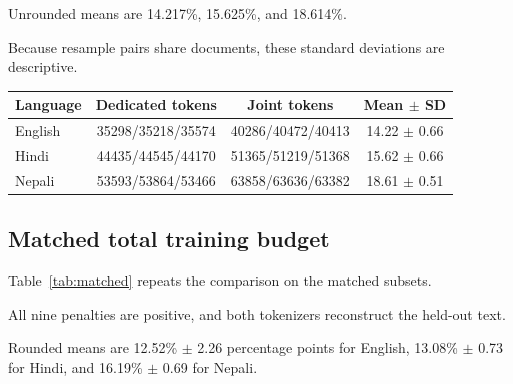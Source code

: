 \documentclass[10pt,twocolumn]{article}
\begin{document}
Unrounded means are 14.217\%, 15.625\%, and 18.614\%.

Because resample pairs share documents, these standard
deviations are descriptive.

\begin{center}
\footnotesize
\setlength{\tabcolsep}{3pt}
\begin{tabular}{@{}lccc@{}}
\toprule
Language & Dedicated tokens & Joint tokens & Mean $\pm$ SD \\
\midrule
English & 35298/35218/35574 & 40286/40472/40413 & 14.22 $\pm$ 0.66 \\
Hindi & 44435/44545/44170 & 51365/51219/51368 & 15.62 $\pm$ 0.66 \\
Nepali & 53593/53864/53466 & 63858/63636/63382 & 18.61 $\pm$ 0.51 \\
\bottomrule
\end{tabular}

\label{tab:fixed}
\end{center}

\subsection{Matched total training budget}

Table~\ref{tab:matched} repeats the comparison on the
matched subsets.

All nine penalties are positive, and both tokenizers
reconstruct the held-out text.

Rounded means are 12.52\% $\pm$ 2.26 percentage points
for English, 13.08\% $\pm$ 0.73 for Hindi, and
16.19\% $\pm$ 0.69 for Nepali.
\end{document}
